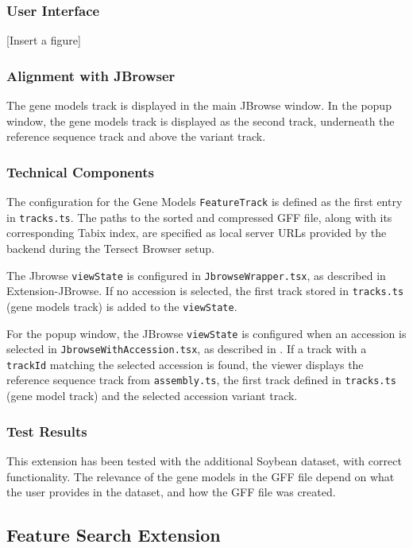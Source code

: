 \documentclass[12pt]{article}
\begin{document}
\subsubsection{User Interface}

[Insert a figure] 

\subsubsection{Alignment with JBrowser}
The gene models track is displayed in the main JBrowse window. In the popup window, the gene models track is displayed as the second track, underneath the reference sequence track and above the variant track.

\subsubsection{Technical Components}
The configuration for the Gene Models \verb+FeatureTrack+ is defined as the first entry in \verb+tracks.ts+. The paths to the sorted and compressed GFF file, along with its corresponding Tabix index, are specified as local server URLs provided by the backend during the Tersect Browser setup. 

The Jbrowse \verb+viewState+ is configured in \verb+JbrowseWrapper.tsx+, as described in Extension-JBrowse. If no accession is selected, the first track stored in \verb+tracks.ts+ (gene models track) is added to the \verb+viewState+.

For the popup window, the JBrowse \verb+viewState+ is configured when an accession is selected in \verb+JbrowseWithAccession.tsx+, as described in . If a track with a \verb+trackId+ matching the selected accession is found, the viewer displays the reference sequence track from \verb+assembly.ts+, the first track defined in \verb+tracks.ts+ (gene model track) and the selected accession variant track. 

\subsubsection{Test Results}
This extension has been tested with the additional Soybean dataset, with correct functionality. The relevance of the gene models in the GFF file depend on what the user provides in the dataset, and how the GFF file was created. 

\subsection{Feature Search Extension}
\end{document}
